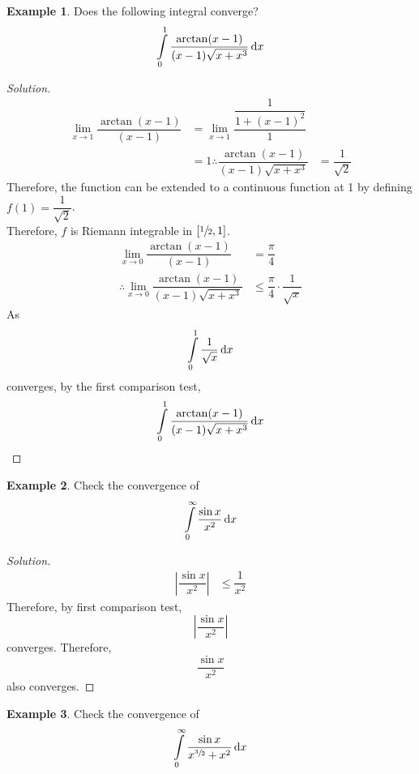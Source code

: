 \documentclass[fleqn, 12pt]{article}
\theoremstyle{definition}
\newtheorem{example}{Example}
\theoremstyle{theorem}
\newenvironment{solution}
{\begin{proof}[Solution]\let\qed\relax}
	{\end{proof}}
\begin{document}
\begin{example}
	Does the following integral converge?
	\[\int\limits_{0}^{1} \dfrac{\arctan (x - 1)}{(x - 1) \sqrt{x + x^3}} \dif x\]
\end{example}

\begin{solution}
	\begin{align*}
		\lim\limits_{x \to 1} \dfrac{\arctan (x - 1)}{(x - 1)} &= \lim\limits_{x \to 1} \dfrac{\dfrac{1}{1 + (x - 1)^2}}{1}\\
		&= 1
		\therefore \dfrac{\arctan (x - 1)}{(x - 1) \sqrt{x + x^3}} &= \dfrac{1}{\sqrt{2}}
	\end{align*}
	Therefore, the function can be extended to a continuous function at 1 by defining $f(1) = \dfrac{1}{\sqrt{2}}$.\\
	Therefore, $f$ is Riemann integrable in $[\sfrac{1}{2}, 1]$.
	\begin{align*}
		\lim\limits_{x \to 0} \dfrac{\arctan (x - 1)}{(x - 1)} &= \dfrac{\pi}{4}\\
		\therefore \lim\limits_{x \to 0} \dfrac{\arctan (x - 1)}{(x - 1) \sqrt{x + x^3}} &\leq \dfrac{\pi}{4} \cdot \dfrac{1}{\sqrt{x}}
	\end{align*}
	As \[\int\limits_{0}^{1} \dfrac{1}{\sqrt{x}} \dif x\] converges, by the first comparison test, \[\int\limits_{0}^{1} \dfrac{\arctan (x - 1)}{(x - 1) \sqrt{x + x^3}} \dif x\]
\end{solution}

\begin{example}
	Check the convergence of \[\int\limits_{0}^{\infty} \dfrac{\sin x}{x^2} \dif x\]
\end{example}

\begin{solution}
	\begin{align*}
		\left\lvert \dfrac{\sin x}{x^2} \right\rvert &\leq \dfrac{1}{x^2} 
	\end{align*}
	Therefore, by first comparison test, \[\left\lvert \dfrac{\sin x}{x^2} \right\rvert\] converges. Therefore, \[\dfrac{\sin x}{x^2}\] also converges.
\end{solution}

\begin{example}
	Check the convergence of \[\int\limits_{0}^{\infty} \dfrac{\sin x}{x^{\sfrac{3}{2}} + x^2} \dif x\]
\end{example}
\end{document}
